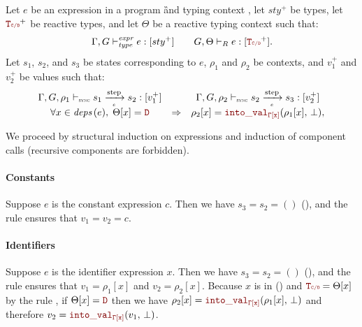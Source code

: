 \begin{skippableproof}
    Let $e$ be an expression in a program \G and typing context \tyCtx, let $sty^+$ be types, let
    $\rType^+$ be reactive types, and let $\Theta$ be a reactive typing context such that:
    \begin{equation*}
        \exprTyped{e}{sty^+} \qquad \exprTypedReact{\Theta}{e}{\rType^+}.
    \end{equation*}
    Let $s_1$, $s_2$, and $s_3$ be states corresponding to $e$, $\rho_1$ and $\rho_2$ be contexts,
    and $v_1^+$ and $v_2^+$ be values such that:
    \begin{equation*}
        \begin{array}{ccc}
            \exprOpsem{\rho_1}{s_1}{e}{s_2}{v_1^+}        &             & \exprOpsem{\rho_2}{s_2}{e}{s_3}{v_2^+}            \\
            \forall x \in \deps{e}, \; \Theta[x] = \dType & \Rightarrow & \rho_2[x] = \intoVal{\tyCtx[x]}{\rho_1[x]}{\bot},
        \end{array}
    \end{equation*}

    We proceed by structural induction on expressions and induction of component calls (recursive
    components are forbidden).

    \paragraph{Constants}
    Suppose $e$ is the constant expression $c$.
    Then we have $s_3 = s_2 = ()$ (), and
    the rule  ensures that $v_1 = v_2 = c$.

    \paragraph{Identifiers}
    Suppose $e$ is the identifier expression $x$.
    Then we have $s_3 = s_2 = ()$ (), and
    the rule  ensures that $v_1 =
        \rho_1[x]$ and $v_2 = \rho_2[x]$. Because $x$ is in 
    () and $\rType =
        \Theta[x]$ by the rule , if
    $\Theta[x] = \dType$ then we have $\rho_2[x] = \intoVal{\tyCtx[x]}{\rho_1[x]}
        {\bot}$ and therefore $v_2 = \intoVal{\tyCtx[x]}{v_1}{\bot}$.


\end{skippableproof}
